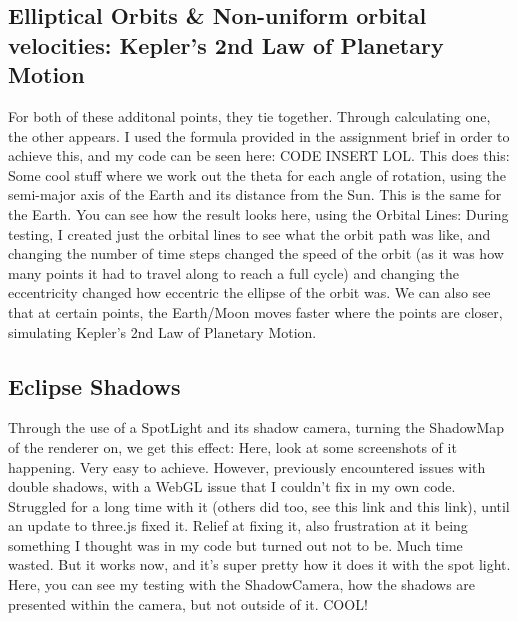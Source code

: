 \documentclass[12pt]{article}
\begin{document}
\subsection{Elliptical Orbits \& Non-uniform orbital velocities: Kepler's 2nd Law of Planetary Motion}
For both of these additonal points, they tie together. Through calculating one, the other appears. I used the formula provided in the assignment brief \cite{assignment} in order to achieve this, and my code can be seen here: CODE INSERT LOL. This does this: Some cool stuff where we work out the theta for each angle of rotation, using the semi-major axis of the Earth and its distance from the Sun. This is the same for the Earth. You can see how the result looks here, using the Orbital Lines: During testing, I created just the orbital lines to see what the orbit path was like, and changing the number of time steps changed the speed of the orbit (as it was how many points it had to travel along to reach a full cycle) and changing the eccentricity changed how eccentric the ellipse of the orbit was. We can also see that at certain points, the Earth/Moon moves faster where the points are closer, simulating Kepler's 2nd Law of Planetary Motion.

\subsection{Eclipse Shadows}
Through the use of a SpotLight and its shadow camera, turning the ShadowMap of the renderer on, we get this effect: Here, look at some screenshots of it happening. Very easy to achieve. However, previously encountered issues with double shadows, with a WebGL issue that I couldn't fix in my own code. Struggled for a long time with it (others did too, see this link and this link), until an update to three.js fixed it. Relief at fixing it, also frustration at it being something I thought was in my code but turned out not to be. Much time wasted. But it works now, and it's super pretty how it does it with the spot light. Here, you can see my testing with the ShadowCamera, how the shadows are presented within the camera, but not outside of it. COOL!
\end{document}
